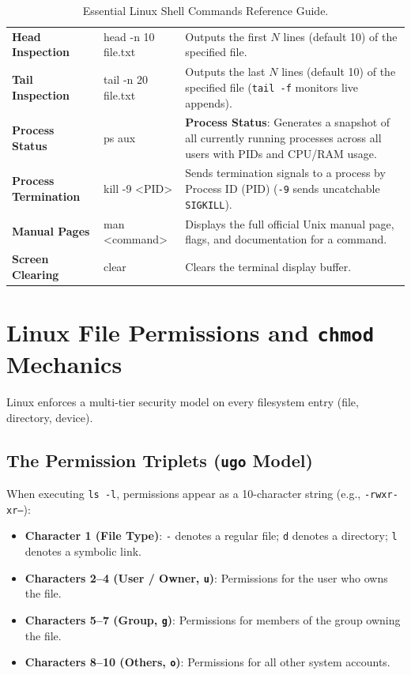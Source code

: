 \begin{table}[htbp]
\begin{tabularx}{\linewidth}{l>{\ttfamily}p{2.8cm}>{\raggedright\arraybackslash}X}
\textbf{Head Inspection} & head -n 10 file.txt & Outputs the first $N$ lines (default 10) of the specified file. \\
\textbf{Tail Inspection} & tail -n 20 file.txt & Outputs the last $N$ lines (default 10) of the specified file (\texttt{tail -f} monitors live appends). \\
\textbf{Process Status} & ps aux & \textbf{Process Status}: Generates a snapshot of all currently running processes across all users with PIDs and CPU/RAM usage. \\
\textbf{Process Termination} & kill -9 <PID> & Sends termination signals to a process by Process ID (PID) (\texttt{-9} sends uncatchable \texttt{SIGKILL}). \\
\textbf{Manual Pages} & man <command> & Displays the full official Unix manual page, flags, and documentation for a command. \\
\textbf{Screen Clearing} & clear & Clears the terminal display buffer. \\
\bottomrule
\end{tabularx}
\caption{Essential Linux Shell Commands Reference Guide.}
\label{tab:linux-commands-master}
\end{table}

\section{Linux File Permissions and \texttt{chmod} Mechanics}

Linux enforces a multi-tier security model on every filesystem entry (file, directory, device).

\subsection{The Permission Triplets (\texttt{ugo} Model)}

When executing \texttt{ls -l}, permissions appear as a 10-character string (e.g., \texttt{-rwxr-xr--}):
\begin{itemize}
    \item \textbf{Character 1 (File Type)}: \texttt{-} denotes a regular file; \texttt{d} denotes a directory; \texttt{l} denotes a symbolic link.
    \item \textbf{Characters 2--4 (User / Owner, \texttt{u})}: Permissions for the user who owns the file.
    \item \textbf{Characters 5--7 (Group, \texttt{g})}: Permissions for members of the group owning the file.
    \item \textbf{Characters 8--10 (Others, \texttt{o})}: Permissions for all other system accounts.
\end{itemize}

